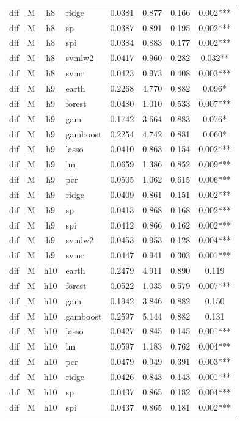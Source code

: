\begin{ThreePartTable}
\begin{longtable}[t]{llclcccc}
dif & M & h8 & ridge & 0.0381 & 0.877 & 0.166 & 0.002***\\
dif & M & h8 & sp & 0.0387 & 0.891 & 0.195 & 0.002***\\
dif & M & h8 & spi & 0.0384 & 0.883 & 0.177 & 0.002***\\
dif & M & h8 & svmlw2 & 0.0417 & 0.960 & 0.282 & 0.032**\\
dif & M & h8 & svmr & 0.0423 & 0.973 & 0.408 & 0.003***\\
\addlinespace
dif & M & h9 & earth & 0.2268 & 4.770 & 0.882 & 0.096*\\
dif & M & h9 & forest & 0.0480 & 1.010 & 0.533 & 0.007***\\
dif & M & h9 & gam & 0.1742 & 3.664 & 0.883 & 0.076*\\
dif & M & h9 & gamboost & 0.2254 & 4.742 & 0.881 & 0.060*\\
dif & M & h9 & lasso & 0.0410 & 0.863 & 0.154 & 0.002***\\
dif & M & h9 & lm & 0.0659 & 1.386 & 0.852 & 0.009***\\
dif & M & h9 & pcr & 0.0505 & 1.062 & 0.615 & 0.006***\\
dif & M & h9 & ridge & 0.0409 & 0.861 & 0.151 & 0.002***\\
dif & M & h9 & sp & 0.0413 & 0.868 & 0.168 & 0.002***\\
dif & M & h9 & spi & 0.0412 & 0.866 & 0.162 & 0.002***\\
dif & M & h9 & svmlw2 & 0.0453 & 0.953 & 0.128 & 0.004***\\
dif & M & h9 & svmr & 0.0447 & 0.941 & 0.303 & 0.001***\\
\addlinespace
dif & M & h10 & earth & 0.2479 & 4.911 & 0.890 & 0.119\\
dif & M & h10 & forest & 0.0522 & 1.035 & 0.579 & 0.007***\\
dif & M & h10 & gam & 0.1942 & 3.846 & 0.882 & 0.150\\
dif & M & h10 & gamboost & 0.2597 & 5.144 & 0.882 & 0.131\\
dif & M & h10 & lasso & 0.0427 & 0.845 & 0.145 & 0.001***\\
dif & M & h10 & lm & 0.0597 & 1.183 & 0.762 & 0.004***\\
dif & M & h10 & pcr & 0.0479 & 0.949 & 0.391 & 0.003***\\
dif & M & h10 & ridge & 0.0426 & 0.843 & 0.143 & 0.001***\\
dif & M & h10 & sp & 0.0437 & 0.865 & 0.182 & 0.004***\\
dif & M & h10 & spi & 0.0437 & 0.865 & 0.181 & 0.002***\\

\end{longtable}
\end{ThreePartTable}
